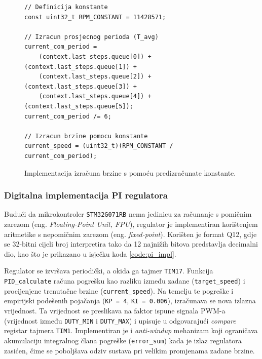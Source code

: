 \documentclass[diplomskirad]{fer}
\begin{document}
\begin{figure}[h!]
	\begin{verbatim}
// Definicija konstante
const uint32_t RPM_CONSTANT = 11428571;

// Izracun prosjecnog perioda (T_avg)
current_com_period =
    (context.last_steps.queue[0]) + (context.last_steps.queue[1]) +
    (context.last_steps.queue[2]) + (context.last_steps.queue[3]) +
    (context.last_steps.queue[4]) + (context.last_steps.queue[5]);
current_com_period /= 6;

// Izracun brzine pomocu konstante
current_speed = (uint32_t)(RPM_CONSTANT / current_com_period);
\end{verbatim}
	\caption{Implementacija izračuna brzine s pomoću predizračunate konstante.}
	\label{code:rpm_constant}
\end{figure}

\subsubsection{Digitalna implementacija PI regulatora}
\label{sssec:pi_regulator}

Budući da mikrokontroler \texttt{STM32G071RB} nema jedinicu za računanje s
pomičnim zarezom (eng. \textit{Floating-Point Unit, FPU}), regulator je
implementiran korištenjem aritmetike s nepomičnim zarezom (eng.
\textit{fixed-point}). Korišten je format Q12, gdje se 32-bitni cijeli broj
interpretira tako da 12 najnižih bitova predstavlja decimalni dio, kao što je
prikazano u isječku koda \ref{code:pi_impl}.

Regulator se izvršava periodički, a okida ga tajmer \texttt{TIM17}. Funkcija
\texttt{PID\_calculate} računa pogrešku kao razliku između zadane
(\texttt{target\_speed}) i procijenjene trenutačne brzine
(\texttt{current\_speed}). Na temelju te pogreške i empirijski podešenih
pojačanja (\texttt{KP = 4}, \texttt{KI = 0.006}), izračunava se nova izlazna
vrijednost. Ta vrijednost se preslikava na faktor ispune signala PWM-a
(vrijednost između \texttt{DUTY\_MIN} i \texttt{DUTY\_MAX}) i upisuje u
odgovarajući \textit{compare} registar tajmera \texttt{TIM1}. Implementiran je
i \textit{anti-windup} mehanizam koji ograničava akumulaciju integralnog člana
pogreške (\texttt{error\_sum}) kada je izlaz regulatora zasićen, čime se
poboljšava odziv sustava pri velikim promjenama zadane brzine.
\end{document}
